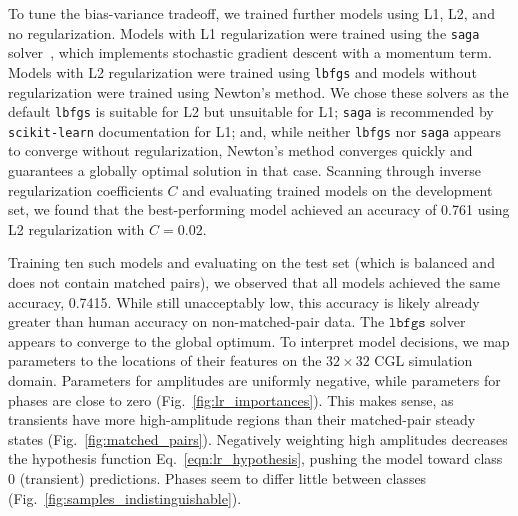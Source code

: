 \documentclass[nofootinbib,pre,superscriptaddress,twocolumn,longbibliography,floatfix]{revtex4-2}
\begin{document}
To tune the bias-variance tradeoff, we trained further models using L1, L2, and no regularization.
Models with L1 regularization were trained using the \texttt{saga} solver~\cite{saga},
which implements stochastic gradient descent with a momentum term.
Models with L2 regularization were trained using \texttt{lbfgs} and models without regularization were trained using Newton's method.
We chose these solvers as the default \texttt{lbfgs} is suitable for L2 but unsuitable for L1;
\texttt{saga} is recommended by \texttt{scikit-learn} documentation for L1;
and, while neither \texttt{lbfgs} nor \texttt{saga} appears to converge without regularization,
Newton's method converges quickly and guarantees a globally optimal solution in that case.
Scanning through inverse regularization coefficients $C$
and evaluating trained models on the development set,
we found that the best-performing model achieved an accuracy of 0.761 using L2 regularization with $C=0.02$.


Training ten such models and evaluating on the test set (which is balanced and does not contain matched pairs),
we observed that all models achieved the same accuracy, 0.7415.
While still unacceptably low, this accuracy is likely already greater than human accuracy on non-matched-pair data.
The $\texttt{lbfgs}$ solver appears to converge to the global optimum.
To interpret model decisions, we map parameters to the locations of their features on the $32 \times 32$ CGL simulation domain.
Parameters for amplitudes are uniformly negative, while parameters for phases are close to zero (Fig.~\ref{fig:lr_importances}).
This makes sense, as transients have more high-amplitude regions than their matched-pair steady states (Fig.~\ref{fig:matched_pairs}).
Negatively weighting high amplitudes decreases the hypothesis function Eq.~\ref{eqn:lr_hypothesis},
pushing the model toward class 0 (transient) predictions.
Phases seem to differ little between classes (Fig.~\ref{fig:samples_indistinguishable}).
\end{document}
